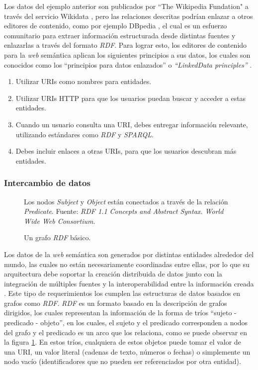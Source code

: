 Los datos del ejemplo anterior son publicados por ``The Wikipedia Fundation" a
través del servicio Wikidata \cite{vrandevcic2014wikidata}, pero las relaciones
descritas podrían enlazar a otros editores de contenido, como por ejemplo
DBpedia \cite{valsecchi2015dbpedia}, el cual es un esfuerzo comunitario para
extraer información estructurada desde distintas fuentes y enlazarlas a través
del formato \textit{RDF}. Para lograr esto, los editores de contenido para la
\textit{web} semántica aplican los siguientes principios a sus datos, los cuales
son conocidos como los ``principios para datos enlazados'' o
\textit{``LinkedData principles''} \cite{bizer2011linked}.

\begin{enumerate}
    \item Utilizar URIs como nombres para entidades.
    \item Utilizar URIs HTTP para que los usuarios puedan buscar y acceder a
    estas entidades.
    \item Cuando un usuario consulta una URI, debes entregar información
    relevante, utilizando estándares como \textit{RDF} y \textit{SPARQL}.
    \item Debes incluir enlaces a otras URIs, para que los usuarios descubran
    más entidades.
\end{enumerate}

\subsubsection{Intercambio de datos}
\label{sec:intercambio-datos}

\begin{figure}
    \centering
    
    \caption{Un grafo \textit{RDF} básico.} Los nodos \textit{Subject} y
    \textit{Object} están conectados a través de la relación \textit{Predicate}.
    Fuente: \textit{RDF 1.1 Concepts and Abstract Syntax. World Wide Web
    Consortium}.
    \label{fig:rdf-graph1}
\end{figure}

Los datos de la \textit{web} semántica son generados por distintas entidades
alrededor del mundo, las cuales no están necesariamente coordinadas entre ellas,
por lo que su arquitectura debe soportar la creación distribuida de datos junto
con la integración de múltiples fuentes y la interoperabilidad entre la
información creada \cite{bizer2011linked}. Este tipo de requerimientos los
cumplen las estructuras de datos basados en grafos como \textit{RDF}.
\textit{RDF} es un formato basado en la descripción de grafos dirigidos, los
cuales representan la información de la forma de tríos ``sujeto - predicado -
objeto'', en los cuales, el sujeto y el predicado corresponden a nodos del grafo
y el predicado es un arco que los relaciona, como se puede observar en la figura
\ref{fig:rdf-graph1}. En estos tríos, cualquiera de estos objetos puede tomar el
valor de una URI, un valor literal (cadenas de texto, números o fechas) o
simplemente un nodo vacío (identificadores que no pueden ser referenciados por
otra entidad).

